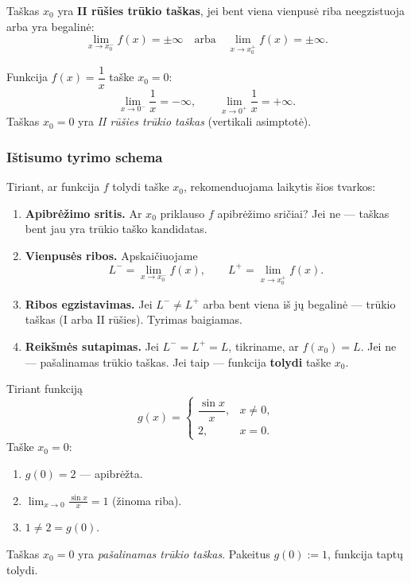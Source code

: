 \begin{definition}
Taškas $x_0$ yra \textbf{II rūšies trūkio taškas}, jei bent viena
vienpusė riba neegzistuoja arba yra begalinė:
\[
    \lim_{x\to x_0^-}f(x)=\pm\infty
    \quad\text{arba}\quad
    \lim_{x\to x_0^+}f(x)=\pm\infty.
\]
\end{definition}

\begin{example}
Funkcija $f(x)=\dfrac{1}{x}$ taške $x_0=0$:
\[
  \lim_{x\to 0^-}\frac{1}{x}=-\infty,\qquad
  \lim_{x\to 0^+}\frac{1}{x}=+\infty.
\]
Taškas $x_0=0$ yra \textit{II rūšies trūkio taškas} (vertikali asimptotė).
\end{example}

\subsubsection*{Ištisumo tyrimo schema}

Tiriant, ar funkcija $f$ tolydi taške $x_0$, rekomenduojama laikytis šios
tvarkos:

\begin{enumerate}
  \item \textbf{Apibrėžimo sritis.} Ar $x_0$ priklauso $f$ apibrėžimo
        sričiai? Jei ne — taškas bent jau yra trūkio taško kandidatas.

  \item \textbf{Vienpusės ribos.} Apskaičiuojame
        \[
          L^- = \lim_{x\to x_0^-}f(x), \qquad
          L^+ = \lim_{x\to x_0^+}f(x).
        \]

  \item \textbf{Ribos egzistavimas.} Jei $L^-\neq L^+$ arba bent viena
        iš jų begalinė — trūkio taškas (I arba II rūšies). Tyrimas
        baigiamas.

  \item \textbf{Reikšmės sutapimas.} Jei $L^-=L^+=L$, tikriname, ar
        $f(x_0)=L$. Jei ne — pašalinamas trūkio taškas. Jei taip —
        funkcija \textbf{tolydi} taške $x_0$.
\end{enumerate}

\begin{example}
Tiriant funkciją
\[
  g(x)=
  \begin{cases}
    \dfrac{\sin x}{x}, & x\neq 0,\\[6pt]
    2,               & x=0.
  \end{cases}
\]
Taške $x_0=0$:
\begin{enumerate}
  \item $g(0)=2$ — apibrėžta.
  \item $\displaystyle\lim_{x\to 0}\frac{\sin x}{x}=1$ (žinoma riba).
  \item $1\neq 2=g(0)$.
\end{enumerate}
Taškas $x_0=0$ yra \textit{pašalinamas trūkio taškas}. Pakeitus $g(0):=1$,
funkcija taptų tolydi.
\end{example}

